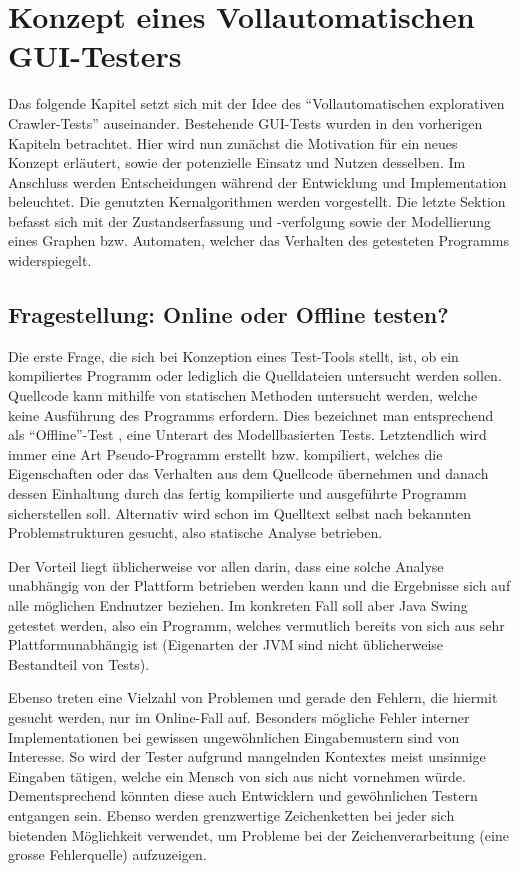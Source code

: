 \chapter{Konzept eines Vollautomatischen GUI-Testers}\label{chapter:conceptfullautoguitesting}


Das folgende Kapitel setzt sich mit der Idee des ``Vollautomatischen explorativen Crawler-Tests''
auseinander. Bestehende GUI-Tests wurden in den vorherigen Kapiteln betrachtet. Hier wird nun zunächst 
die Motivation für ein neues Konzept erläutert, sowie der potenzielle Einsatz und Nutzen desselben.
Im Anschluss werden Entscheidungen während der Entwicklung und Implementation beleuchtet.
Die genutzten Kernalgorithmen werden vorgestellt. Die letzte Sektion befasst sich mit der
Zustandserfassung und -verfolgung sowie der Modellierung eines Graphen bzw. Automaten, welcher
das Verhalten des getesteten Programms widerspiegelt.


\section{Fragestellung: Online oder Offline testen?}\label{section:offoronlinetesting}


Die erste Frage, die sich bei Konzeption eines Test-Tools stellt, ist, ob ein kompiliertes Programm
oder lediglich die Quelldateien untersucht werden sollen. Quellcode kann mithilfe von statischen
Methoden untersucht werden, welche keine Ausführung des Programms erfordern. Dies bezeichnet man
entsprechend als ``Offline''-Test \cite{offlinetesting}, eine Unterart des Modellbasierten Tests.
Letztendlich wird immer eine Art Pseudo-Programm erstellt bzw. kompiliert, welches die
Eigenschaften oder das Verhalten aus dem Quellcode übernehmen und danach dessen Einhaltung durch
das fertig kompilierte und ausgeführte Programm sicherstellen soll. Alternativ wird schon
im Quelltext selbst nach bekannten Problemstrukturen gesucht, also statische Analyse betrieben.

Der Vorteil liegt üblicherweise vor allen darin, dass eine solche Analyse unabhängig von der
Plattform betrieben werden kann und die Ergebnisse sich auf alle möglichen Endnutzer beziehen.
Im konkreten Fall soll aber Java Swing getestet werden, also ein Programm, welches vermutlich
bereits von sich aus sehr Plattformunabhängig ist (Eigenarten der JVM sind nicht üblicherweise
Bestandteil von Tests).

Ebenso treten eine Vielzahl von Problemen und gerade den Fehlern, die hiermit gesucht werden,
nur im Online-Fall auf. Besonders mögliche Fehler interner Implementationen bei gewissen ungewöhnlichen
Eingabemustern sind von Interesse. So wird der Tester aufgrund mangelnden Kontextes meist unsinnige
Eingaben tätigen, welche ein Mensch von sich aus nicht vornehmen würde. Dementsprechend könnten
diese auch Entwicklern und gewöhnlichen Testern entgangen sein. Ebenso werden grenzwertige
Zeichenketten bei jeder sich bietenden Möglichkeit verwendet, um Probleme bei der Zeichenverarbeitung
(eine grosse Fehlerquelle) aufzuzeigen.


